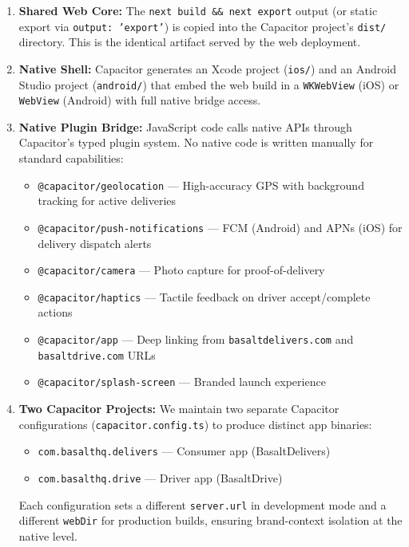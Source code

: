 \documentclass[11pt, letterpaper]{article}
\begin{document}
\begin{enumerate}
    \item \textbf{Shared Web Core:} The \texttt{next build \&\& next export} output (or static export via \texttt{output: 'export'}) is copied into the Capacitor project's \texttt{dist/} directory. This is the identical artifact served by the web deployment.
    \item \textbf{Native Shell:} Capacitor generates an Xcode project (\texttt{ios/}) and an Android Studio project (\texttt{android/}) that embed the web build in a \texttt{WKWebView} (iOS) or \texttt{WebView} (Android) with full native bridge access.
    \item \textbf{Native Plugin Bridge:} JavaScript code calls native APIs through Capacitor's typed plugin system. No native code is written manually for standard capabilities:
    \begin{itemize}
        \item \texttt{@capacitor/geolocation} --- High-accuracy GPS with background tracking for active deliveries
        \item \texttt{@capacitor/push-notifications} --- FCM (Android) and APNs (iOS) for delivery dispatch alerts
        \item \texttt{@capacitor/camera} --- Photo capture for proof-of-delivery
        \item \texttt{@capacitor/haptics} --- Tactile feedback on driver accept/complete actions
        \item \texttt{@capacitor/app} --- Deep linking from \texttt{basaltdelivers.com} and \texttt{basaltdrive.com} URLs
        \item \texttt{@capacitor/splash-screen} --- Branded launch experience
    \end{itemize}
    \item \textbf{Two Capacitor Projects:} We maintain two separate Capacitor configurations (\texttt{capacitor.config.ts}) to produce distinct app binaries:
    \begin{itemize}
        \item \texttt{com.basalthq.delivers} --- Consumer app (BasaltDelivers)
        \item \texttt{com.basalthq.drive} --- Driver app (BasaltDrive)
    \end{itemize}
    Each configuration sets a different \texttt{server.url} in development mode and a different \texttt{webDir} for production builds, ensuring brand-context isolation at the native level.
\end{enumerate}
\end{document}
